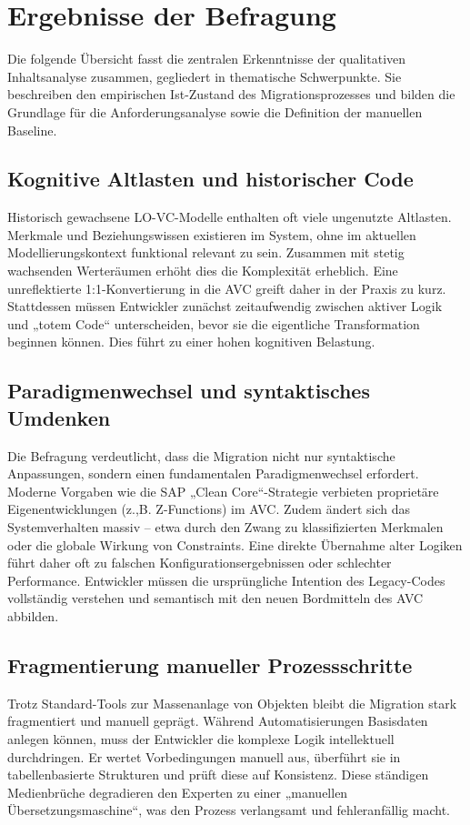 \section{Ergebnisse der Befragung}
\label{sec:ergebnisse_interview}
Die folgende Übersicht fasst die zentralen Erkenntnisse der qualitativen Inhaltsanalyse zusammen, gegliedert in thematische Schwerpunkte. Sie beschreiben den empirischen Ist-Zustand des Migrationsprozesses und bilden die Grundlage für die Anforderungsanalyse sowie die Definition der manuellen Baseline.

\subsection{Kognitive Altlasten und historischer Code}
Historisch gewachsene \ac{LO-VC}-Modelle enthalten oft viele ungenutzte Altlasten. Merkmale und Beziehungswissen existieren im System, ohne im aktuellen Modellierungskontext funktional relevant zu sein. Zusammen mit stetig wachsenden Werteräumen erhöht dies die Komplexität erheblich. Eine unreflektierte 1:1-Konvertierung in die \ac{AVC} greift daher in der Praxis zu kurz. Stattdessen müssen Entwickler zunächst zeitaufwendig zwischen aktiver Logik und „totem Code“ unterscheiden, bevor sie die eigentliche Transformation beginnen können. Dies führt zu einer hohen kognitiven Belastung.

\subsection{Paradigmenwechsel und syntaktisches Umdenken}
Die Befragung verdeutlicht, dass die Migration nicht nur syntaktische Anpassungen, sondern einen fundamentalen Paradigmenwechsel erfordert. Moderne Vorgaben wie die SAP „Clean Core“-Strategie verbieten proprietäre Eigenentwicklungen (z.,B. Z-Functions) im \ac{AVC}. Zudem ändert sich das Systemverhalten massiv -- etwa durch den Zwang zu klassifizierten Merkmalen oder die globale Wirkung von Constraints. Eine direkte Übernahme alter Logiken führt daher oft zu falschen Konfigurationsergebnissen oder schlechter Performance. Entwickler müssen die ursprüngliche Intention des Legacy-Codes vollständig verstehen und semantisch mit den neuen Bordmitteln des \ac{AVC} abbilden.

\subsection{Fragmentierung manueller Prozessschritte}
Trotz Standard-Tools zur Massenanlage von Objekten bleibt die Migration stark fragmentiert und manuell geprägt. Während Automatisierungen Basisdaten anlegen können, muss der Entwickler die komplexe Logik intellektuell durchdringen. Er wertet Vorbedingungen manuell aus, überführt sie in tabellenbasierte Strukturen und prüft diese auf Konsistenz. Diese ständigen Medienbrüche degradieren den Experten zu einer „manuellen Übersetzungsmaschine“, was den Prozess verlangsamt und fehleranfällig macht.


